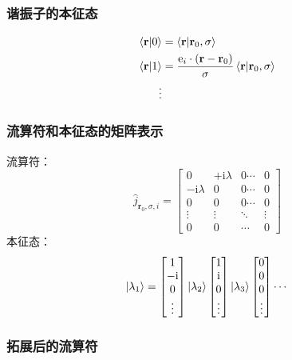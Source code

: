 \documentclass[UTF8]{beamer}
\begin{document}
\begin{frame}
    \frametitle{谐振子的本征态}
    \begin{align}
        \braket{\mathbf{r}|0}&=\braket{\mathbf{r}|\mathbf{r}_0,\sigma}\\
        \braket{\mathbf{r}|1}&=\frac{\mathrm{e}_i\cdot(\mathbf{r}-\mathbf{r}_0)}{\sigma}\braket{\mathbf{r}|\mathbf{r}_0,\sigma}\\
        \vdots 
    \end{align}
\end{frame}
\begin{frame}
    \frametitle{流算符和本征态的矩阵表示}
    流算符：
    \begin{equation*}
        \hat{j}_{\mathbf{r}_0,\sigma,i}=
        \begin{bmatrix}
            0                 &+\mathrm{i}\lambda&0\cdots&0\\
            -\mathrm{i}\lambda&0                 &0\cdots&0\\
            0                 &0                 &0\cdots&0\\
            \vdots            &\vdots            &\ddots &\vdots \\
            0                   &0               &\cdots&0    
        \end{bmatrix}
    \end{equation*}
    本征态：
    \begin{equation*}
        \ket{\lambda_{1}}=
        \begin{bmatrix}
            1\\
            -\mathrm{i}\\
            0\\
            \vdots
        \end{bmatrix}
        \ket{\lambda_{2}}
        \begin{bmatrix}
            1\\
            \mathrm{i}\\
            0\\
            \vdots
        \end{bmatrix}
        \ket{\lambda_{3}}
        \begin{bmatrix}
            0\\
            0\\
            0\\
            \vdots
        \end{bmatrix}
        \cdots
    \end{equation*}
\end{frame}
\begin{frame}
    \frametitle{拓展后的流算符}
    
    

\end{frame}
\end{document}
